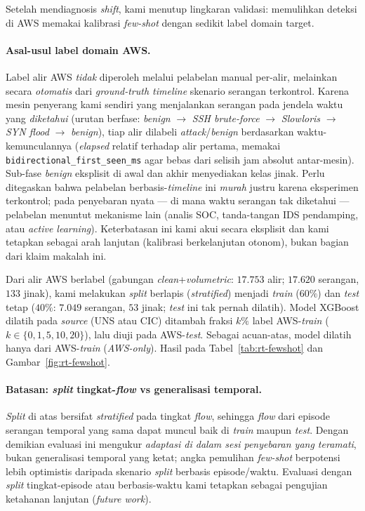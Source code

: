 \documentclass[11pt,a4paper]{article}
\begin{document}
Setelah mendiagnosis \emph{shift}, kami menutup lingkaran validasi: memulihkan deteksi
di AWS memakai kalibrasi \emph{few-shot} dengan sedikit label domain target.

\paragraph{Asal-usul label domain AWS.} Label alir AWS \emph{tidak} diperoleh
melalui pelabelan manual per-alir, melainkan secara \emph{otomatis} dari
\emph{ground-truth timeline} skenario serangan terkontrol. Karena mesin penyerang
kami sendiri yang menjalankan serangan pada jendela waktu yang \emph{diketahui}
(urutan berfase: \emph{benign} $\rightarrow$ \emph{SSH brute-force} $\rightarrow$
\emph{Slowloris} $\rightarrow$ \emph{SYN flood} $\rightarrow$ \emph{benign}), tiap
alir dilabeli \emph{attack}/\emph{benign} berdasarkan waktu-kemunculannya
(\emph{elapsed} relatif terhadap alir pertama, memakai
\texttt{bidirectional\_first\_seen\_ms} agar bebas dari selisih jam absolut
antar-mesin). Sub-fase \emph{benign} eksplisit di awal dan akhir menyediakan
kelas jinak. Perlu ditegaskan bahwa pelabelan berbasis-\emph{timeline} ini
\emph{murah} justru karena eksperimen terkontrol; pada penyebaran nyata --- di
mana waktu serangan tak diketahui --- pelabelan menuntut mekanisme lain (analis
SOC, tanda-tangan IDS pendamping, atau \emph{active learning}). Keterbatasan ini
kami akui secara eksplisit dan kami tetapkan sebagai arah lanjutan (kalibrasi
berkelanjutan otonom), bukan bagian dari klaim makalah ini.

Dari
alir AWS berlabel (gabungan \emph{clean}+\emph{volumetric}: $17{.}753$ alir; $17{.}620$
serangan, $133$ jinak), kami melakukan \emph{split} berlapis (\emph{stratified})
menjadi \emph{train} ($60\%$) dan \emph{test} tetap ($40\%$: $7{.}049$ serangan,
$53$ jinak; \emph{test} ini tak pernah dilatih). Model XGBoost dilatih pada
\emph{source} (UNS atau CIC) ditambah fraksi $k\%$ label AWS-\emph{train}
($k\in\{0,1,5,10,20\}$), lalu diuji pada AWS-\emph{test}. Sebagai acuan-atas,
model dilatih hanya dari AWS-\emph{train} (\emph{AWS-only}). Hasil pada
Tabel~\ref{tab:rt-fewshot} dan Gambar~\ref{fig:rt-fewshot}.

\paragraph{Batasan: \emph{split} tingkat-\emph{flow} vs generalisasi temporal.}
\emph{Split} di atas bersifat \emph{stratified} pada tingkat \emph{flow}, sehingga
\emph{flow} dari episode serangan temporal yang sama dapat muncul baik di
\emph{train} maupun \emph{test}. Dengan demikian evaluasi ini mengukur
\emph{adaptasi di dalam sesi penyebaran yang teramati}, bukan generalisasi temporal
yang ketat; angka pemulihan \emph{few-shot} berpotensi lebih optimistis daripada
skenario \emph{split} berbasis episode/waktu. Evaluasi dengan \emph{split}
tingkat-episode atau berbasis-waktu kami tetapkan sebagai pengujian ketahanan
lanjutan (\emph{future work}).
\end{document}
